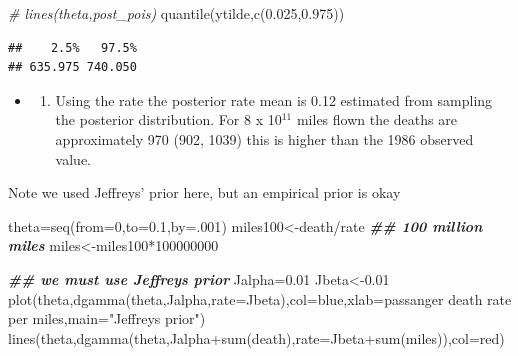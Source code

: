\documentclass[
]{book}
\newenvironment{Shaded}{\begin{snugshade}}{\end{snugshade}}
\newcommand{\AttributeTok}[1]{\textcolor[rgb]{0.77,0.63,0.00}{#1}}
\newcommand{\CommentTok}[1]{\textcolor[rgb]{0.56,0.35,0.01}{\textit{#1}}}
\newcommand{\DecValTok}[1]{\textcolor[rgb]{0.00,0.00,0.81}{#1}}
\newcommand{\DocumentationTok}[1]{\textcolor[rgb]{0.56,0.35,0.01}{\textbf{\textit{#1}}}}
\newcommand{\FloatTok}[1]{\textcolor[rgb]{0.00,0.00,0.81}{#1}}
\newcommand{\FunctionTok}[1]{\textcolor[rgb]{0.00,0.00,0.00}{#1}}
\newcommand{\NormalTok}[1]{#1}
\newcommand{\OtherTok}[1]{\textcolor[rgb]{0.56,0.35,0.01}{#1}}
\newcommand{\SpecialCharTok}[1]{\textcolor[rgb]{0.00,0.00,0.00}{#1}}
\newcommand{\StringTok}[1]{\textcolor[rgb]{0.31,0.60,0.02}{#1}}
\providecommand{\tightlist}{%
  \setlength{\itemsep}{0pt}\setlength{\parskip}{0pt}}
\theoremstyle{definition}
\theoremstyle{definition}
\theoremstyle{definition}
\theoremstyle{definition}
\theoremstyle{remark}
\begin{document}
\begin{Shaded}
\begin{Highlighting}[]
\CommentTok{\# lines(theta,post\_pois)}
 \FunctionTok{quantile}\NormalTok{(ytilde,}\FunctionTok{c}\NormalTok{(}\FloatTok{0.025}\NormalTok{,}\FloatTok{0.975}\NormalTok{))}
\end{Highlighting}
\end{Shaded}

\begin{verbatim}
##    2.5%   97.5% 
## 635.975 740.050
\end{verbatim}

\begin{itemize}
\item
  \begin{enumerate}
  \def\labelenumi{(\alph{enumi})}
  \setcounter{enumi}{3}
  \tightlist
  \item
    Using the rate the posterior rate mean is 0.12 estimated from sampling the posterior distribution. For 8 x 10\(^11\) miles flown the deaths are approximately 970 (902, 1039) this is higher than the 1986 observed value.
  \end{enumerate}
\end{itemize}

Note we used Jeffreys' prior here, but an empirical prior is okay

\begin{Shaded}
\begin{Highlighting}[]
\NormalTok{  theta}\OtherTok{=}\FunctionTok{seq}\NormalTok{(}\AttributeTok{from=}\DecValTok{0}\NormalTok{,}\AttributeTok{to=}\FloatTok{0.1}\NormalTok{,}\AttributeTok{by=}\NormalTok{.}\DecValTok{001}\NormalTok{)}
\NormalTok{ miles100}\OtherTok{\textless{}{-}}\NormalTok{death}\SpecialCharTok{/}\NormalTok{rate }\DocumentationTok{\#\# 100 million miles}
\NormalTok{ miles}\OtherTok{\textless{}{-}}\NormalTok{miles100}\SpecialCharTok{*}\DecValTok{100000000}

 


   
  \DocumentationTok{\#\# we must use Jeffreys\textquotesingle{} prior}
\NormalTok{    Jalpha}\OtherTok{=}\FloatTok{0.01}
\NormalTok{  Jbeta}\OtherTok{\textless{}{-}}\FloatTok{0.01}
 \FunctionTok{plot}\NormalTok{(theta,}\FunctionTok{dgamma}\NormalTok{(theta,Jalpha,}\AttributeTok{rate=}\NormalTok{Jbeta),}\AttributeTok{col=}\StringTok{\textquotesingle{}blue\textquotesingle{}}\NormalTok{,}\AttributeTok{xlab=}\StringTok{\textquotesingle{}passanger death rate per miles\textquotesingle{}}\NormalTok{,}\AttributeTok{main=}\StringTok{"Jeffreys\textquotesingle{} prior"}\NormalTok{)}
\FunctionTok{lines}\NormalTok{(theta,}\FunctionTok{dgamma}\NormalTok{(theta,Jalpha}\SpecialCharTok{+}\FunctionTok{sum}\NormalTok{(death),}\AttributeTok{rate=}\NormalTok{Jbeta}\SpecialCharTok{+}\FunctionTok{sum}\NormalTok{(miles)),}\AttributeTok{col=}\StringTok{\textquotesingle{}red\textquotesingle{}}\NormalTok{)}
\end{Highlighting}
\end{Shaded}
\end{document}
